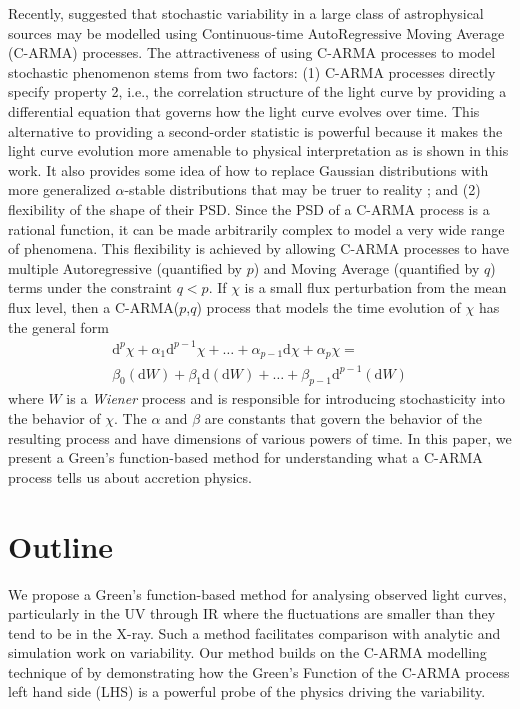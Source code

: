 \documentclass[a4paper,fleqn,usenatbib]{mnras}
\begin{document}
Recently, \citet{Kelly14} suggested that stochastic variability in a large class of astrophysical sources may be modelled using Continuous-time AutoRegressive Moving Average (C-ARMA) processes. The attractiveness of using C-ARMA processes to model stochastic phenomenon stems from two factors: (1) C-ARMA processes directly specify property 2, i.e., the correlation structure of the light curve by providing a differential equation that governs how the light curve evolves over time. This alternative to providing a second-order statistic is powerful because it makes the light curve evolution more amenable to physical interpretation as is shown in this work. It also provides some idea of how to replace Gaussian distributions with more generalized $\alpha$-stable distributions that may be truer to reality \citep{BrockwellMarquardt05, BrockwellLinder09}; and (2) flexibility of the shape of their PSD. Since the PSD of a C-ARMA process is a rational function, it can be made arbitrarily complex to model a very wide range of phenomena. This flexibility is achieved by allowing C-ARMA processes to have multiple Autoregressive (quantified by $p$) and Moving Average (quantified by $q$) terms under the constraint $q < p$. If $\chi$ is a small flux perturbation from the mean flux level, then a C-ARMA($p$,$q$) process that models the time evolution of $\chi$ has the general form
\begin{multline}\label{eq:CARMAIntro}
\mathrm{d}^{p}\chi + \alpha_{1} \mathrm{d}^{p-1}\chi + \ldots + \alpha_{p-1} \mathrm{d}\chi + \alpha_{p} \chi = \\ \beta_{0} (\mathrm{d}W) + \beta_{1} \mathrm{d}(\mathrm{d}W) + \ldots + \beta_{p-1} \mathrm{d}^{p-1}(\mathrm{d}W)
\end{multline}
where $W$ is a \textit{Wiener} process and is responsible for introducing stochasticity into the behavior of $\chi$. The $\alpha$ and $\beta$ are constants that govern the behavior of the resulting process and have dimensions of various powers of time. In this paper, we present a Green's function-based method for understanding what a C-ARMA process tells us about accretion physics.

\section[Outline]{Outline}\label{sec:Outline}

We propose a Green's function-based method for analysing observed light curves, particularly in the UV through IR where the fluctuations are smaller than they tend to be in the X-ray. Such a method facilitates comparison with analytic and simulation work on variability. Our method builds on the C-ARMA modelling technique of \citet{Kelly14} by demonstrating how the Green's Function of the C-ARMA process left hand side (LHS) is a powerful probe of the physics driving the variability.
\end{document}
